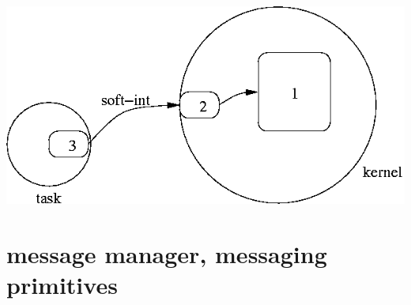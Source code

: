 \begin{center}
\includegraphics[width=0.5\linewidth]{figures/message.png}
\end{center}

\newpage

\section{message manager, \textbf{messaging primitives}}

